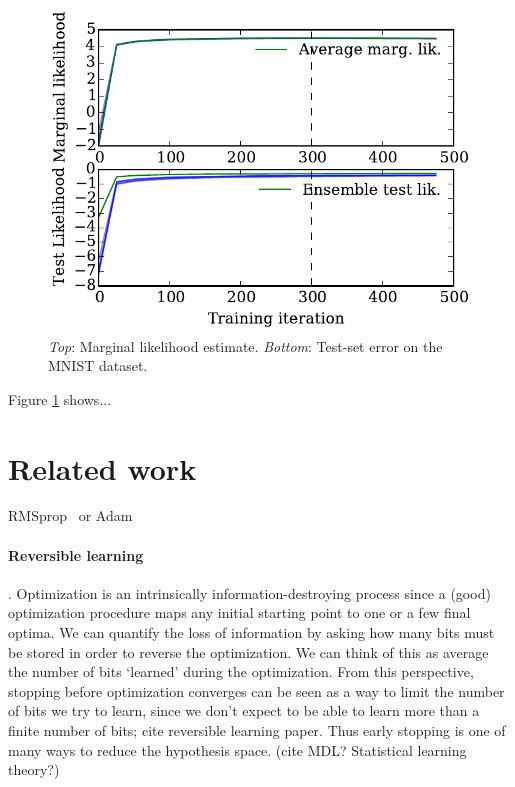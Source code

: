 \documentclass[]{article}
\begin{document}
\begin{figure}
\begin{center}
\includegraphics[width=\columnwidth]{../experiments/2015_02_27_first_entropic_sgd/6_ensemble/ensemble}
\vskip -0.1in
\caption{\emph{Top}: Marginal likelihood estimate.
\emph{Bottom}: Test-set error on the MNIST dataset.}
\label{fig:ensemble}
\end{center}
\end{figure}

Figure \ref{fig:ensemble} shows...

\section{Related work}

RMSprop~\cite{Tieleman2012} or Adam~\citep{Adam14}

\paragraph{Reversible learning} \citet{MacDuvAda2015hyper}. Optimization is an
intrinsically information-destroying process since a (good) optimization
procedure maps any initial starting point to one or a few final optima. We can
quantify the loss of information by asking how many bits must be stored in order
to reverse the optimization. We can think of this as average the number of bits
`learned' during the optimization. From this perspective, stopping before optimization
converges can be seen as a way to limit the number of bits we try to learn,
since we don't expect to be able to learn more than a finite number of bits; cite reversible
learning paper. Thus early stopping is one of many ways to reduce the hypothesis
space. (cite MDL? Statistical learning theory?)
\end{document}
